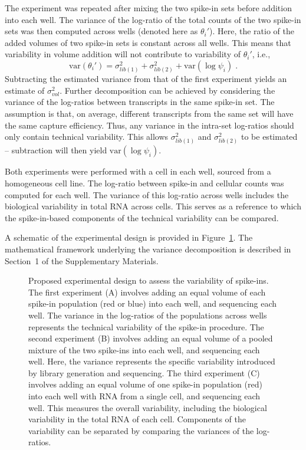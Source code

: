 \documentclass{article}
\begin{document}
The experiment was repeated after mixing the two spike-in sets before addition into each well. 
The variance of the log-ratio of the total counts of the two spike-in sets was then computed across wells (denoted here as $\theta_i'$).
Here, the ratio of the added volumes of two spike-in sets is constant across all wells.
This means that variability in volume addition will not contribute to variability of $\theta_i'$, i.e.,
\[
    \mbox{var}(\theta_i') = \sigma^2_{lib(1)} + \sigma^2_{lib(2)} + \mbox{var}(\log \psi_i) \;.
\]
Subtracting the estimated variance from that of the first experiment yields an estimate of $\sigma_{vol}^2$.
Further decomposition can be achieved by considering the variance of the log-ratios between transcripts in the same spike-in set.
The assumption is that, on average, different transcripts from the same set will have the same capture efficiency.
Thus, any variance in the intra-set log-ratios should only contain technical variability.
This allows $\sigma^2_{lib(1)}$ and $\sigma^2_{lib(2)}$ to be estimated -- subtraction will then yield $\mbox{var}(\log \psi_i)$.

Both experiments were performed with a cell in each well, sourced from a homogeneous cell line.
The log-ratio between spike-in and cellular counts was computed for each well.
The variance of this log-ratio across wells includes the biological variability in total RNA across cells.
This serves as a reference to which the spike-in-based components of the technical variability can be compared. 

A schematic of the experimental design is provided in Figure~\ref{fig:expdesign}.
The mathematical framework underlying the variance decomposition is described in Section~1 of the Supplementary Materials.


\begin{figure}[H]
\begin{center}
\end{center}
\caption{Proposed experimental design to assess the variability of spike-ins.
The first experiment (A) involves adding an equal volume of each spike-in population (red or blue) into each well, and sequencing each well.
The variance in the log-ratios of the populations across wells represents the technical variability of the spike-in procedure.
The second experiment (B) involves adding an equal volume of a pooled mixture of the two spike-ins into each well, and sequencing each well.
Here, the variance represents the specific variability introduced by library generation and sequencing.
The third experiment (C) involves adding an equal volume of one spike-in population (red) into each well with RNA from a single cell, and sequencing each well.
This measures the overall variability, including the biological variability in the total RNA of each cell.
Components of the variability can be separated by comparing the variances of the log-ratios.
}
\label{fig:expdesign}
\end{figure}
\end{document}

